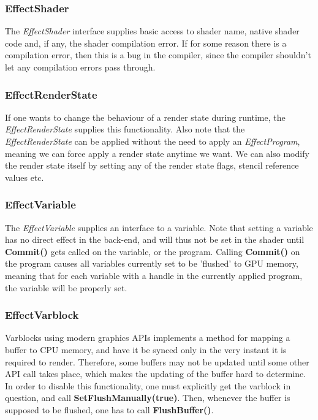\documentclass{article}
\begin{document}
\subsubsection{EffectShader}
The \textit{EffectShader} interface supplies basic access to shader name, native shader code and, if any, the shader compilation error. If for some reason there is a compilation error, then this is a bug in the compiler, since the compiler shouldn't let any compilation errors pass through. 

\subsubsection{EffectRenderState}
If one wants to change the behaviour of a render state during runtime, the \textit{EffectRenderState} supplies this functionality. Also note that the \textit{EffectRenderState} can be applied without the need to apply an \textit{EffectProgram}, meaning we can force apply a render state anytime we want. We can also modify the render state itself by setting any of the render state flags, stencil reference values etc.

\subsubsection{EffectVariable}
The \textit{EffectVariable} supplies an interface to a variable. Note that setting a variable has no direct effect in the back-end, and will thus not be set in the shader until \textbf{Commit()} gets called on the variable, or the program. Calling \textbf{Commit()} on the program causes all variables currently set to be 'flushed' to GPU memory, meaning that for each variable with a handle in the currently applied program, the variable will be properly set.

\subsubsection{EffectVarblock}
Varblocks using modern graphics APIs implements a method for mapping a buffer to CPU memory, and have it be synced only in the very instant it is required to render. Therefore, some buffers may not be updated until some other API call takes place, which makes the updating of the buffer hard to determine. In order to disable this functionality, one must explicitly get the varblock in question, and call \textbf{SetFlushManually(true)}. Then, whenever the buffer is supposed to be flushed, one has to call \textbf{FlushBuffer()}.
\end{document}
